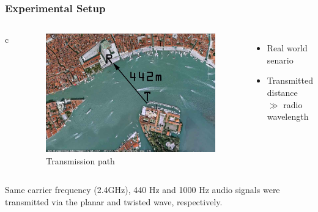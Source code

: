 \documentclass[xcolor=dvipsnames]{beamer}
\newenvironment{items}[1][]
{\begin{itemize}
    \ifthenelse{\isempty{#1}}
    {\setlength{\itemsep}{12pt}}{\setlength{\itemsep}{#1}}}
  {\end{itemize}}
\begin{document}
\begin{frame}
	\frametitle{Experimental Setup}
  \begin{columns}{c}
		\begin{figure}
      \includegraphics[width=\textwidth]{birdeyeview}
      \caption{Transmission path}
      \label{pic:birdeye}
		\end{figure}
		\begin{items}
		\item Real world senario
		\item Transmitted distance $\gg$ radio wavelength
		\end{items}
  \end{columns}
\end{frame}
\begin{frame}
  Same carrier frequency (2.4GHz), 440 Hz and 1000 Hz audio signals
  were transmitted via the planar and twisted wave, respectively.
\end{frame}


\end{document}
